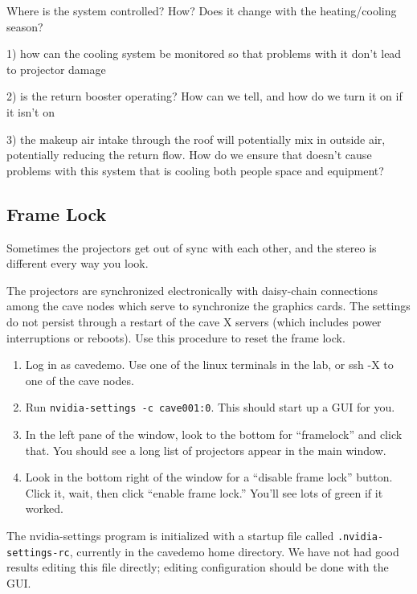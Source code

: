 \documentclass[11pt]{article}
\newcommand{\cmd}[1]{\texttt{#1}}
\begin{document}
Where is the system controlled?  How?  Does it change with the
heating/cooling season?

1) how can the cooling system be monitored so that problems with it
don’t lead to projector damage

2) is the return booster operating?  How can we tell, and how do we
turn it on if it isn’t on

3) the makeup air intake through the roof will potentially mix in
outside air, potentially reducing the return flow.  How do we ensure
that doesn’t cause problems with this system that is cooling both
people space and equipment?


\subsection{Frame Lock}
\label{framelock}

Sometimes the projectors get out of sync with each other, and the
stereo is different every way you look.

The projectors are synchronized electronically with daisy-chain
connections among the cave nodes which serve to synchronize the
graphics cards.  The settings do not persist through a restart of the
cave X servers (which includes power interruptions or reboots).  Use
this procedure to reset the frame lock.

\begin{enumerate}

\item Log in as cavedemo.  Use one of the linux terminals in the lab,
  or ssh -X to one of the cave nodes.

\item Run \cmd{nvidia-settings -c cave001:0}.  This should start up
  a GUI for you.

\item In the left pane of the window, look to the bottom for
  ``framelock'' and click that.  You should see a long list of
  projectors appear in the main window.

\item Look in the bottom right of the window for a ``disable frame
  lock'' button.  Click it, wait, then click ``enable frame lock.''
  You'll see lots of green if it worked.

\end{enumerate}


The nvidia-settings program is initialized with a startup file called
\cmd{.nvidia-settings-rc}, currently in the cavedemo home
directory.  We have not had good results editing this file directly;
editing configuration should be done with the GUI.
\end{document}
